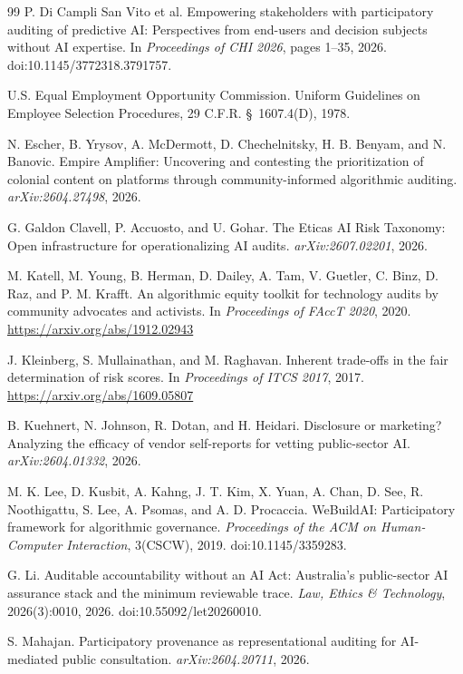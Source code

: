 \documentclass[10pt]{article}
\begin{document}
\begin{thebibliography}{99}
P. Di Campli San Vito et al.
Empowering stakeholders with participatory auditing of predictive AI:
Perspectives from end-users and decision subjects without AI expertise.
In \emph{Proceedings of CHI 2026}, pages 1--35, 2026.
doi:10.1145/3772318.3791757.

U.S. Equal Employment Opportunity Commission.
Uniform Guidelines on Employee Selection Procedures, 29 C.F.R.
\S~1607.4(D), 1978.

N. Escher, B. Yrysov, A. McDermott, D. Chechelnitsky, H. B. Benyam, and
N. Banovic.
Empire Amplifier: Uncovering and contesting the prioritization of colonial
content on platforms through community-informed algorithmic auditing.
\emph{arXiv:2604.27498}, 2026.

G. Galdon Clavell, P. Accuosto, and U. Gohar.
The Eticas AI Risk Taxonomy: Open infrastructure for operationalizing AI
audits.
\emph{arXiv:2607.02201}, 2026.

M. Katell, M. Young, B. Herman, D. Dailey, A. Tam, V. Guetler, C. Binz,
D. Raz, and P. M. Krafft.
An algorithmic equity toolkit for technology audits by community advocates and
activists.
In \emph{Proceedings of FAccT 2020}, 2020.
\url{https://arxiv.org/abs/1912.02943}

J. Kleinberg, S. Mullainathan, and M. Raghavan.
Inherent trade-offs in the fair determination of risk scores.
In \emph{Proceedings of ITCS 2017}, 2017.
\url{https://arxiv.org/abs/1609.05807}

B. Kuehnert, N. Johnson, R. Dotan, and H. Heidari.
Disclosure or marketing? Analyzing the efficacy of vendor self-reports for
vetting public-sector AI.
\emph{arXiv:2604.01332}, 2026.

M. K. Lee, D. Kusbit, A. Kahng, J. T. Kim, X. Yuan, A. Chan, D. See,
R. Noothigattu, S. Lee, A. Psomas, and A. D. Procaccia.
WeBuildAI: Participatory framework for algorithmic governance.
\emph{Proceedings of the ACM on Human-Computer Interaction}, 3(CSCW), 2019.
doi:10.1145/3359283.

G. Li.
Auditable accountability without an AI Act: Australia's public-sector AI
assurance stack and the minimum reviewable trace.
\emph{Law, Ethics \& Technology}, 2026(3):0010, 2026.
doi:10.55092/let20260010.

S. Mahajan.
Participatory provenance as representational auditing for AI-mediated public
consultation.
\emph{arXiv:2604.20711}, 2026.


\end{thebibliography}
\end{document}
